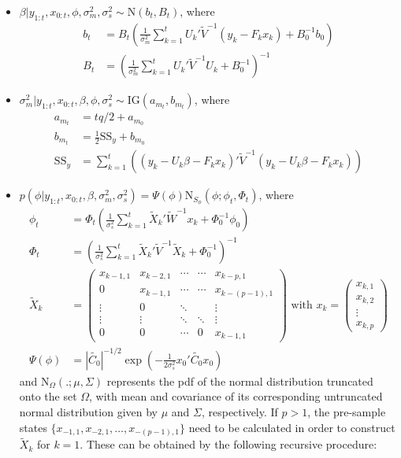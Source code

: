 \documentclass{article}
\begin{document}
\begin{itemize}
\item $\beta|y_{1:t},x_{0:t},\phi,\sigma^2_m,\sigma^2_s \sim \mbox{N}(b_t,B_t)$, where
\begin{align*}
b_t &= B_t\left(\frac{1}{\sigma^2_m} \sum^t_{k=1} U_k'\tilde{V}^{-1}(y_k - F_kx_k) + B_0^{-1}b_0\right) \\
B_t &= \left(\frac{1}{\sigma^2_m} \sum^t_{k=1} U_k'\tilde{V}^{-1}U_k + B_0^{-1}\right)^{-1}
\end{align*}
\item $\sigma^2_m|y_{1:t},x_{0:t},\beta,\phi,\sigma^2_s \sim \mbox{IG}(a_{m_t}, b_{m_t})$, where
\begin{align*}
a_{m_t} &= tq/2 + a_{m_0} \\
b_{m_t} &= \frac{1}{2}\mbox{SS}_y + b_{m_0} \\
\mbox{SS}_y &= \sum^t_{k=1} \left((y_k - U_k\beta - F_kx_k)'\tilde{V}^{-1}(y_k - U_k\beta - F_kx_k)\right)
\end{align*}
\item $p(\phi|y_{1:t},x_{0:t},\beta,\sigma^2_m,\sigma^2_s) = \Psi(\phi)\mbox{N}_{S_\phi}(\phi; \phi_t,\Phi_t)$, where
\begin{align*}
\phi_t &= \Phi_t\left(\frac{1}{\sigma^2_s} \sum^t_{k=1} \tilde{X}_k'\tilde{W}^{-1}x_k + \Phi_0^{-1}\phi_0\right) \\
\Phi_t &= \left(\frac{1}{\sigma^2_s} \sum^t_{k=1} \tilde{X}_k'\tilde{V}^{-1}\tilde{X}_k + \Phi_0^{-1}\right)^{-1} \\
\tilde{X}_k &= \left(\begin{array}{ccccc}
x_{k-1,1} & x_{k-2,1} & \cdots & \cdots & x_{k-p,1} \\
0 & x_{k-1,1} & \cdots & \cdots & x_{k-(p-1),1} \\
\vdots & 0 & \ddots & & \vdots \\
\vdots & \vdots & \ddots & \ddots & \vdots \\
0 & 0 & \cdots & 0 & x_{k-1,1}
\end{array}
\right) \mbox{ with } x_k = \left(\begin{array}{c} x_{k,1} \\ x_{k,2} \\ \vdots \\ x_{k,p} \end{array}\right)\\
\Psi(\phi) &= \left|\tilde{C_0}\right|^{-1/2}\exp\left(-\frac{1}{2\sigma^2_s}x_0'\tilde{C_0}x_0\right)
\end{align*}
\noindent and $\mbox{N}_{\Omega}(.;\mu,\Sigma)$ represents the pdf of the normal distribution truncated onto the set $\Omega$, with mean and covariance of its corresponding untruncated normal distribution given by $\mu$ and $\Sigma$, respectively. If $p > 1$, the pre-sample states $\{x_{-1,1}, x_{-2,1}, \ldots, x_{-(p-1),1}\}$ need to be calculated in order to construct $\tilde{X}_k$ for $k = 1$. These can be obtained by the following recursive procedure: \\

\end{itemize}
\end{document}
